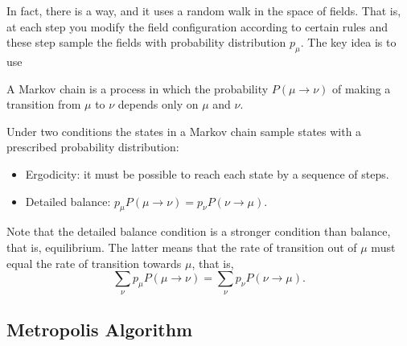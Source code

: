 \documentclass[12pt]{article}
\begin{document}
In fact, there is a way, and it uses a random walk in the space of
fields. That is, at each step you modify the field configuration
according to certain rules and these step sample the fields with
probability distribution $p_\mu$. The key idea is to use 
\begin{definition}
  A Markov chain is a process in which the probability $P(\mu\to\nu)$
  of making a transition from $\mu$ to $\nu$ depends only on $\mu$ and $\nu$.
\end{definition}
Under two conditions the states in a Markov chain sample states with a
prescribed probability distribution:
\begin{itemize}
\item Ergodicity: it must be possible to reach each state by a
  sequence of steps.
\item Detailed balance:
  \begin{math}
    p_\mu P(\mu\to\nu) = p_\nu P(\nu\to \mu).
  \end{math}
\end{itemize}
Note that the detailed balance condition is a stronger condition than
balance, that is, equilibrium. The latter means that the rate of
transition out of $\mu$ must equal the rate of transition towards
$\mu$, that is,
\begin{equation}
  \sum_\nu p_\mu P(\mu\to\nu) = \sum_\nu p_\nu P(\nu\to \mu).
\end{equation}

\subsection{Metropolis Algorithm}
\end{document}
